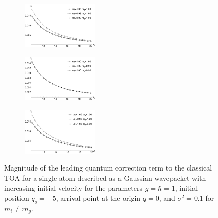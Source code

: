 \documentclass[%
 reprint,
 amsmath,amssymb,
 aps,
]{revtex4-1}
\begin{document}
\begin{figure}[t!]
\begin{subfigure}
\centering
\includegraphics[width=0.4\textwidth]{mi_less_mg_lead_overlay}
\label{fig:mi_less_mg}
\end{subfigure}
\begin{subfigure}
\centering
\includegraphics[width=0.4\textwidth]{mi_greater_mg_lead_overlay}
\label{mi_greater_mg}
\end{subfigure}
\begin{subfigure}
\centering
\includegraphics[width=0.4\textwidth]{mi_nequal_mg_lead_overlay}
\label{fig:mi_nequal_mg}
\end{subfigure}
\caption{Magnitude of the leading quantum correction term to the classical TOA for a single atom described as a Gaussian wavepacket with increasing initial velocity for the parameters $g=\hbar=1$, initial position $q_o=-5$, arrival point at the origin $q=0$, and $\sigma^2=0.1$ for $m_i \neq m_g$.}
\label{fig:leadingquantumcorrection}
\end{figure}
\end{document}
